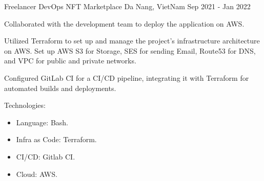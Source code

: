 \begin{cventries}
    \cventry
    {Freelancer DevOps} %
    {NFT Marketplace} %
    {Da Nang, VietNam} %
    {Sep 2021 - Jan 2022} %
    {
      \begin{cvitems} %
        \item {Collaborated with the development team to deploy the application on AWS.}
        \item {Utilized Terraform to set up and manage the project's infrastructure architecture on AWS. Set up AWS S3 for Storage, SES for sending Email, Route53 for DNS, and VPC for public and private networks.}
        \item {Configured GitLab CI for a CI/CD pipeline, integrating it with Terraform for automated builds and deployments.}
        \item {Technologies:
            \begin{itemize}
                \item {Language: Bash.}
                \item {Infra as Code: Terraform.}
                \item {CI/CD: Gitlab CI.}
                \item {Cloud: AWS.}
            \end{itemize}
        }
      \end{cvitems}
    }


\end{cventries}
